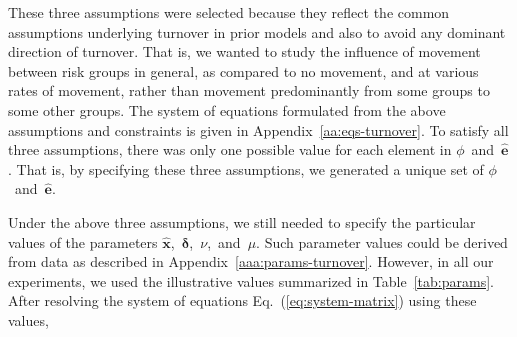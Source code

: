 These three assumptions were selected
because they reflect the common assumptions underlying turnover in prior models
\citep{Zhang2012,Henry2015}
and also to avoid any dominant direction of turnover.
That is, we wanted to study
the influence of movement between risk groups in general,
as compared to no movement, and at various rates of movement,
rather than movement predominantly from some groups to some other groups.
The system of equations formulated from the above assumptions and constraints
is given in Appendix~\ref{aa:eqs-turnover}.
To satisfy all three assumptions, there was only one possible value
for each element in $\phi$~and~$\bm{\hat{e}}$.
That is, by specifying these three assumptions,
we generated a unique set of $\phi$~and~$\bm{\hat{e}}$.
\par
Under the above three assumptions,
we still needed to specify the particular values of the parameters
$\bm{\hat{x}}$,~$\bm{\delta}$,~$\nu$,~and~$\mu$.
Such parameter values could be derived from data as described in Appendix~\ref{aaa:params-turnover}.
However, in all our experiments, we used the illustrative values summarized in
Table~\ref{tab:params}.
After resolving the system of equations Eq.~(\ref{eq:system-matrix}) using these values,
